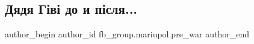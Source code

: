  
 
 
 
 

\subsection{Дядя Гіві до и після...}
\label{sec:04_02_2023.fb.fb_group.mariupol.pre_war.1.dyadya_g_v__do_i_p_s}

\ifcmt
 author_begin
   author_id fb_group.mariupol.pre_war
 author_end
\fi
